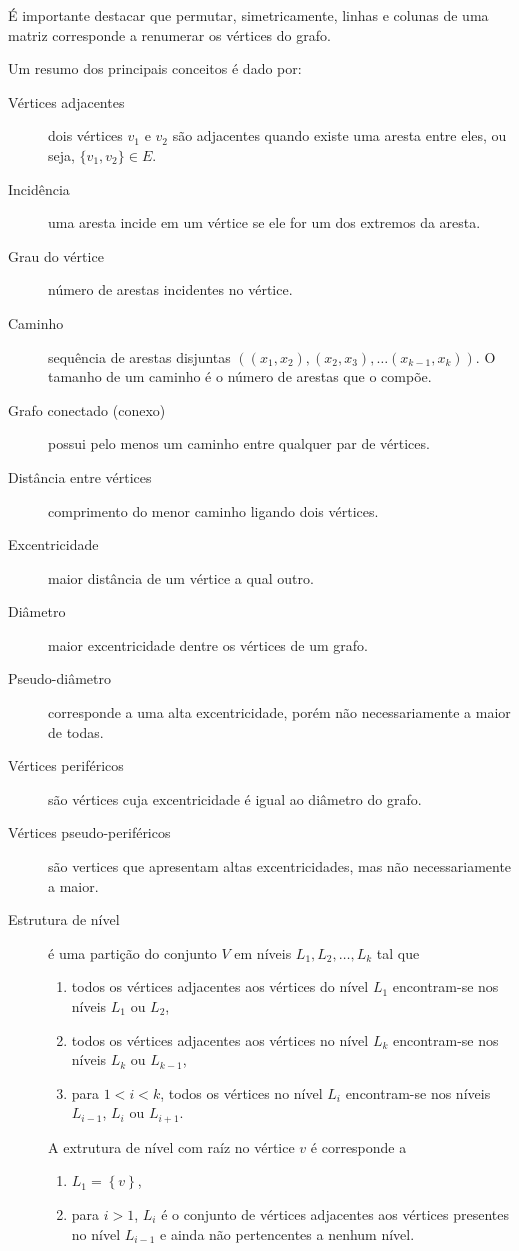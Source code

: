 É importante destacar que permutar, simetricamente, linhas e colunas de uma
matriz corresponde a renumerar os vértices do grafo.

Um resumo dos principais conceitos é dado por:
\begin{description}
    \item[Vértices adjacentes]  dois vértices $v_1$ e $v_2$ são adjacentes
        quando existe uma aresta entre eles, ou seja, $\{v_1, v_2\} \in E$.
    \item[Incidência] uma aresta incide em um vértice se ele for um dos extremos
        da aresta.
    \item[Grau do vértice] número de arestas incidentes no vértice.
    \item[Caminho] sequência de arestas disjuntas $\left( (x_1, x_2), (x_2,
        x_3), \ldots (x_{k - 1}, x_k) \right)$. O tamanho de um caminho é o
        número de arestas que o compõe.
    \item[Grafo conectado (conexo)] possui pelo menos um caminho entre qualquer
        par de vértices.
    \item[Distância entre vértices] comprimento do menor caminho ligando dois vértices.
    \item[Excentricidade] maior distância de um vértice a qual outro.
    \item[Diâmetro] maior excentricidade dentre os vértices de um grafo.
    \item[Pseudo-diâmetro] corresponde a uma alta excentricidade, porém não
        necessariamente a maior de todas.
    \item[Vértices periféricos] são vértices cuja excentricidade é igual ao
        diâmetro do grafo.
    \item[Vértices pseudo-periféricos] são vertices que apresentam altas
        excentricidades, mas não necessariamente a maior.
    \item[Estrutura de nível] é uma partição do conjunto $V$ em níveis $L_1,
        L_2, \ldots, L_k$ tal que
        \begin{enumerate}
            \item todos os vértices adjacentes aos vértices do nível $L_1$
                encontram-se nos níveis $L_1$ ou $L_2$,
            \item todos os vértices adjacentes aos vértices no nível $L_k$
                encontram-se nos níveis $L_k$ ou $L_{k - 1}$,
            \item para $1 < i < k$, todos os vértices no nível $L_i$
                encontram-se nos níveis $L_{i - 1}$, $L_i$ ou $L_{i + 1}$.
        \end{enumerate}

        A extrutura de nível com raíz no vértice $v$ é corresponde a
        \begin{enumerate}
            \item $L_1 = \left\{ v \right\}$,
            \item para $i > 1$, $L_i$ é o conjunto de vértices adjacentes aos
                vértices presentes no nível $L_{i - 1}$ e ainda não pertencentes
                a nenhum nível.
        \end{enumerate}
\end{description}
